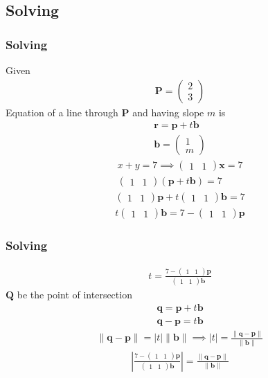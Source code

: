 \documentclass{beamer}
\providecommand{\brak}[1]{\ensuremath{\left(#1\right)}}
\theoremstyle{remark}
\providecommand{\norm}[1]{\lVert#1\rVert}
\newcommand{\myvec}[1]{\ensuremath{\begin{pmatrix}#1\end{pmatrix}}}
\let\vec\mathbf
\numberwithin{equation}{section}
\begin{document}
\subsection{Solving}
\begin{frame}
\frametitle{Solving}
Given  
\begin{align}
\vec{P}=\myvec{2\\3}
\end{align}
Equation of a line through $\vec{P}$ and having slope $m$ is
\begin{align}
\vec{r}=\vec{p}+t\vec{b} \\
\vec{b}=\myvec{1\\m}
 \end{align}
\begin{align}
  x+y=7 \implies  \myvec{1 & 1}\vec{x}=7 \\
  \myvec{1&1}\brak{\vec{p}+t\vec{b}}=7
\end{align}
\begin{align}
\myvec{1&1}\vec{p}+t\myvec{1&1}\vec{b} = 7\\
t\myvec{1&1}\vec{b} =7-\myvec{1&1}\vec{p} 
\end{align}
\end{frame}
\begin{frame}
\frametitle{Solving}
\begin{align}
t=\frac{7-\myvec{1&1}\vec{p}}{\myvec{1&1}\vec{b}}
\end{align}
$\vec{Q}$ be the point of intersection
\begin{align}
\vec{q}=\vec{p}+t\vec{b} \\
\vec{q}-\vec{p}=t\vec{b} 
\end{align}
\begin{align}
\norm{\vec{q}-\vec{p}}=|t|\norm{\vec{b}} 
\implies |t|=\frac{\norm{\vec{q}-\vec{p}}}{\norm{\vec{b}}} 
\end{align}
\begin{align}
\left|  \frac{7-\myvec{1&1}\vec{p}}{\myvec{1&1}\vec{b}} \right|=\frac{\norm{\vec{q}-\vec{p}}}{\norm{\vec{b}}}
\end{align}
\end{frame}
\end{document}
